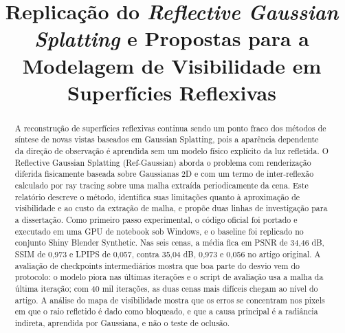 \documentclass[conference]{IEEEtran}
\begin{document}
\title{Replicação do \textit{Reflective Gaussian Splatting} e Propostas para a Modelagem de Visibilidade em Superfícies Reflexivas}

\author{
\and
{}
}

\maketitle

\begin{abstract}
A reconstrução de superfícies reflexivas continua sendo um ponto fraco dos métodos de síntese de novas vistas baseados em Gaussian Splatting, pois a aparência dependente da direção de observação é aprendida sem um modelo físico explícito da luz refletida. O Reflective Gaussian Splatting (Ref-Gaussian) aborda o problema com renderização diferida fisicamente baseada sobre Gaussianas 2D e com um termo de inter-reflexão calculado por ray tracing sobre uma malha extraída periodicamente da cena. Este relatório descreve o método, identifica suas limitações quanto à aproximação de visibilidade e ao custo da extração de malha, e propõe duas linhas de investigação para a dissertação. Como primeiro passo experimental, o código oficial foi portado e executado em uma GPU de notebook sob Windows, e o baseline foi replicado no conjunto Shiny Blender Synthetic. Nas seis cenas, a média fica em PSNR de 34,46 dB, SSIM de 0,973 e LPIPS de 0,057, contra 35,04 dB, 0,973 e 0,056 no artigo original. A avaliação de checkpoints intermediários mostra que boa parte do desvio vem do protocolo: o modelo piora nas últimas iterações e o script de avaliação usa a malha da última iteração; com 40 mil iterações, as duas cenas mais difíceis chegam ao nível do artigo. A análise do mapa de visibilidade mostra que os erros se concentram nos pixels em que o raio refletido é dado como bloqueado, e que a causa principal é a radiância indireta, aprendida por Gaussiana, e não o teste de oclusão.
\end{abstract}
\end{document}
